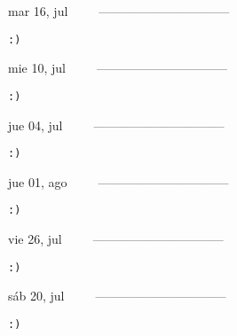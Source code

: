 \documentclass[letterpaper,10pt]{article}
\begin{document}
\begin{multicols}{3}
{mar 16, jul\ \ \ \ \ --------------------------------}
\begin{flushright}\begin{small}\texttt{:)}\end{small}\end{flushright}
\vfill
{mie 10, jul\ \ \ \ \ --------------------------------}
\begin{flushright}\begin{small}\texttt{:)}\end{small}\end{flushright}\par
\vfill
{jue 04, jul\ \ \ \ \ --------------------------------}
\begin{flushright}\begin{small}\texttt{:)}\end{small}\end{flushright}\par
\vfill
\end{multicols}
\vspace{1.05cm}

\begin{multicols}{3}
{jue 01, ago\ \ \ \ \ --------------------------------}
\begin{flushright}\begin{small}\texttt{:)}\end{small}\end{flushright}
\vfill
{vie 26, jul\ \ \ \ \ --------------------------------}
\begin{flushright}\begin{small}\texttt{:)}\end{small}\end{flushright}\par
\vfill
{sáb 20, jul\ \ \ \ \ --------------------------------}
\begin{flushright}\begin{small}\texttt{:)}\end{small}\end{flushright}\par
\vfill
\end{multicols}
\vspace{1.05cm}
\end{document}
